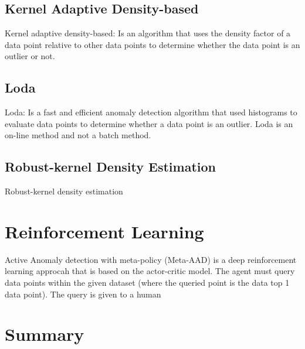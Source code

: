 \subsection{Kernel Adaptive Density-based}
Kernel adaptive density-based: Is an algorithm that uses the density factor of a data point relative to other data points to determine whether the data point is an outlier or not.

\subsection{Loda}
Loda: Is a fast and efficient anomaly detection algorithm that used histograms to evaluate data points to determine whether a data point is an outlier. Loda is an on-line method and not a batch method.

\subsection{Robust-kernel Density Estimation}
Robust-kernel density estimation

\section{Reinforcement Learning}
Active Anomaly detection with meta-policy (Meta-AAD) is a deep reinforcement learning approcah that is based on the actor-critic model. The agent must query data points within the given dataset (where the queried point is the data top 1 data point). The query is given to a human 


\section{Summary}

